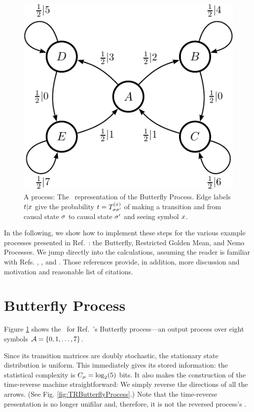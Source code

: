 \begin{figure}[th]
\centering
\includegraphics{../chapter4/figures/butterfly_feM_ur}
\caption{A  process: The \eM\ representation of the Butterfly
  Process. Edge labels $t|{x}$ give the probability
  $t = T^{({x})}_{\sigma{\sigma^{\prime}}}$ of making a
  transition and from causal state $\sigma$ to causal state
  ${\sigma^{\prime}}$ and seeing symbol ${x}$.
  }
\label{fig:ButterflyProcess}
\end{figure}

In the following, we show how to implement these steps for the various example
processes presented in Ref.~\cite{Maho09a}: the Butterfly, Restricted Golden Mean,
and Nemo Processes. We jump directly into the calculations, assuming the reader
is familiar with Refs. \cite{Crut08a}, \cite{Crut08b}, and \cite{Maho09a}.
Those references provide, in addition, more discussion and motivation and
reasonable list of citations.

\section{Butterfly Process}

Figure \ref{fig:ButterflyProcess} shows the \eM\ for Ref.~\cite{Maho09a}'s
Butterfly process---an output process over eight symbols
$\mathcal{A} = \{0,1,\ldots,7\}$.

Since its transition matrices are doubly stochastic, the stationary state
distribution is uniform. This immediately gives its stored information: the
statistical complexity is $C_\mu = \log_2(5)$ bits. It also makes the
construction of the time-reverse machine straightforward: We simply reverse
the directions of all the arrows. (See Fig. \ref{fig:TRButterflyProcess}.)
Note that the time-reverse presentation is no longer unifilar and, therefore,
it is not the reversed process's \eM. 

